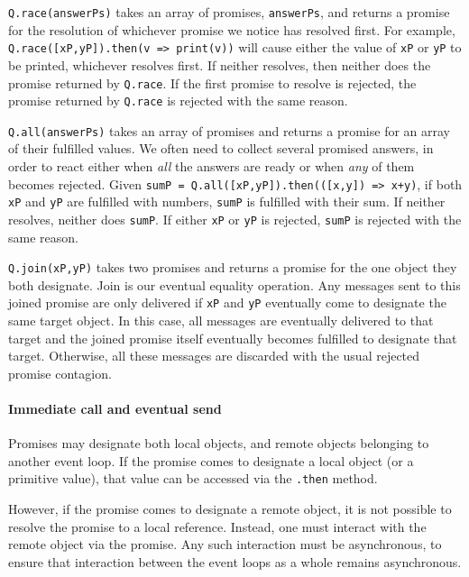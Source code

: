 \documentclass{llncs}
\begin{document}
\begin{description*}
\item[{\tt Q.race(answerPs)}] takes an array of promises, {\tt answerPs}, and returns a promise for the resolution of whichever promise we notice has resolved first. For example, {\tt Q.race([xP,yP]).then(v => print(v))} will cause either the value of {\tt xP} or {\tt yP} to be printed, whichever resolves first. If neither resolves, then neither does the promise returned by {\tt Q.race}. If the first promise to resolve is rejected, the promise returned by {\tt Q.race} is rejected with the same reason.

\item[{\tt Q.all(answerPs)}] takes an array of promises and returns a promise for an array of their fulfilled values. We often need to collect several promised answers, in order to react either when \emph{all} the answers are ready or when \emph{any} of them becomes rejected. Given {\tt sumP = Q.all([xP,yP]).then(([x,y]) => x+y)}, if both {\tt xP} and {\tt yP} are fulfilled with numbers, {\tt sumP} is fulfilled with their sum. If neither resolves, neither does {\tt sumP}. If either {\tt xP} or {\tt yP} is rejected, {\tt sumP} is rejected with the same reason.

\item[{\tt Q.join(xP,yP)}] takes two promises and returns a promise for the one object they both designate. Join is our eventual equality operation. Any messages sent to this joined promise are only delivered if {\tt xP} and {\tt yP} eventually come to designate the same target object. In this case, all messages are eventually delivered to that target and the joined promise itself eventually becomes fulfilled to designate that target. Otherwise, all these messages are discarded with the usual rejected promise contagion.
\end{description*}

\paragraph{Immediate call and eventual send}

Promises may designate both local objects, and remote objects belonging to another event loop. If the promise comes to designate a local object (or a primitive value), that value can be accessed via the {\tt .then} method.

However, if the promise comes to designate a remote object, it is not possible to resolve the promise to a local reference. Instead, one must interact with the remote object via the promise. Any such interaction must be asynchronous, to ensure that interaction between the event loops as a whole remains asynchronous.
\end{document}
